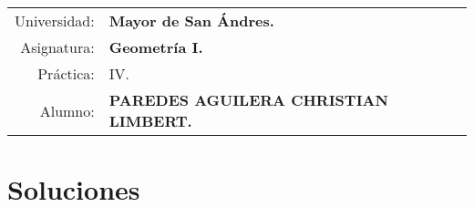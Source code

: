 \documentclass[10pt]{article}
\begin{document}
\begin{tabular}{r l }
Universidad: & \textbf{Mayor de San Ándres.}\\
Asignatura: & \textbf{Geometría I.}\\
 Práctica: & IV.\\ Alumno: & \textbf{PAREDES AGUILERA CHRISTIAN LIMBERT.}
\end{tabular}
\begin{flushleft}
\end{flushleft}

\section*{\center Soluciones}
\end{document}

